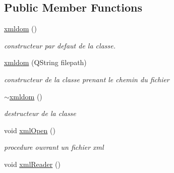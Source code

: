\subsection*{Public Member Functions}
\begin{DoxyCompactItemize}
\item 
\hypertarget{classxmldom_ad072d12232c0cd4b25d3c5241baf4cf0}{\hyperlink{classxmldom_ad072d12232c0cd4b25d3c5241baf4cf0}{xmldom} ()}\label{classxmldom_ad072d12232c0cd4b25d3c5241baf4cf0}

\begin{DoxyCompactList}\small\item\em constructeur par defaut de la classe. \end{DoxyCompactList}\item 
\hyperlink{classxmldom_acb5340a747b9623a2d9294bbbfa39774}{xmldom} (Q\-String filepath)
\begin{DoxyCompactList}\small\item\em constructeur de la classe prenant le chemin du fichier \end{DoxyCompactList}\item 
\hypertarget{classxmldom_af4a0f240c83121ac2cbb75b181cb095f}{\hyperlink{classxmldom_af4a0f240c83121ac2cbb75b181cb095f}{$\sim$xmldom} ()}\label{classxmldom_af4a0f240c83121ac2cbb75b181cb095f}

\begin{DoxyCompactList}\small\item\em destructeur de la classe \end{DoxyCompactList}\item 
\hypertarget{classxmldom_a1b066769999c193a6565b1dfaa6b2f30}{void \hyperlink{classxmldom_a1b066769999c193a6565b1dfaa6b2f30}{xml\-Open} ()}\label{classxmldom_a1b066769999c193a6565b1dfaa6b2f30}

\begin{DoxyCompactList}\small\item\em procedure ouvrant un fichier xml \end{DoxyCompactList}\item 
\hypertarget{classxmldom_afee9a603705a4fbe1763d0e2d2b59e3e}{void \hyperlink{classxmldom_afee9a603705a4fbe1763d0e2d2b59e3e}{xml\-Reader} ()}\label{classxmldom_afee9a603705a4fbe1763d0e2d2b59e3e}


\end{DoxyCompactItemize}
